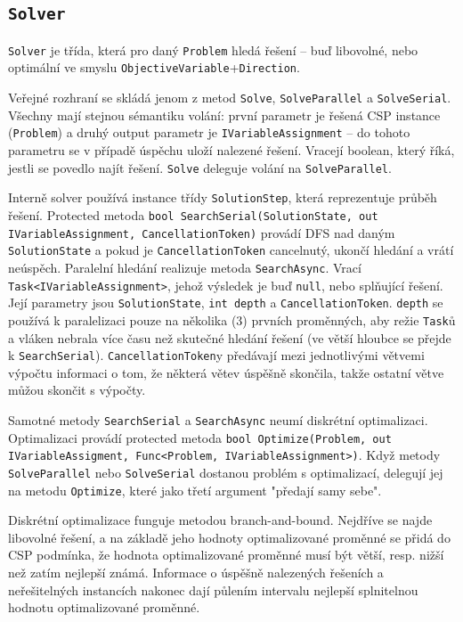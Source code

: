 \documentclass[a4paper]{article}
\begin{document}
\subsection{\texttt{Solver}}
\texttt{Solver} je třída, která pro daný \texttt{Problem} hledá řešení -- buď
libovolné, nebo optimální ve smyslu
\texttt{ObjectiveVariable}+\texttt{Direction}.

Veřejné rozhraní se skládá jenom z metod \texttt{Solve}, \texttt{SolveParallel}
a \texttt{SolveSerial}. Všechny mají stejnou sémantiku volání: první parametr je
řešená CSP instance (\texttt{Problem}) a druhý output parametr je
\texttt{IVariableAssignment} -- do tohoto parametru se v případě úspěchu uloží
nalezené řešení. Vracejí boolean, který říká, jestli se povedlo najít řešení.
\texttt{Solve} deleguje volání na \texttt{SolveParallel}.

Interně solver používá instance třídy \texttt{SolutionStep},
která reprezentuje průběh řešení. Protected metoda
\texttt{bool SearchSerial(SolutionState, out IVariableAssignment, CancellationToken)}
provádí DFS nad daným \texttt{SolutionState} a pokud je
\texttt{CancellationToken} cancelnutý, ukončí hledání a vrátí neúspěch.
Paralelní hledání realizuje metoda \texttt{SearchAsync}.
Vrací \texttt{Task<IVariableAssignment>}, jehož výsledek je buď \texttt{null},
nebo splňující řešení. Její parametry jsou \texttt{SolutionState}, \texttt{int
depth} a \texttt{CancellationToken}.
\texttt{depth} se používá k paralelizaci pouze na několika (3) prvních
proměnných, aby režie \texttt{Task}ů a vláken nebrala více času než skutečné
hledání řešení (ve větší hloubce se přejde k \texttt{SearchSerial}).
\texttt{CancellationToken}y předávají mezi jednotlivými větvemi výpočtu
informaci o tom, že některá větev úspěšně skončila, takže ostatní větve můžou
skončit s výpočty.

Samotné metody \texttt{SearchSerial} a \texttt{SearchAsync} neumí diskrétní
optimalizaci. Optimalizaci provádí protected metoda
\texttt{bool Optimize(Problem, out IVariableAssigment, Func<Problem,
IVariableAssignment>)}. Když metody \texttt{SolveParallel} nebo \texttt{SolveSerial}
dostanou problém s optimalizací, delegují jej na metodu \texttt{Optimize}, které
jako třetí argument "předají samy sebe".

Diskrétní optimalizace funguje metodou branch-and-bound. Nejdříve se najde
libovolné řešení, a na základě jeho hodnoty optimalizované proměnné se přidá
do CSP podmínka, že hodnota optimalizované proměnné musí být větší, resp. nižší
než zatím nejlepší známá. Informace o úspěšně nalezených řešeních a
neřešitelných instancích nakonec dají půlením intervalu nejlepší splnitelnou
hodnotu optimalizované proměnné.
\end{document}
